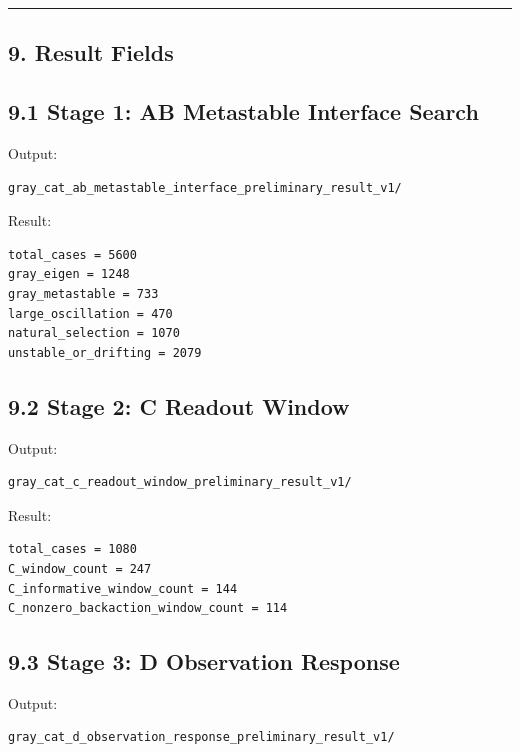 \documentclass{article}
\begin{document}
\begin{center}\rule{0.5\linewidth}{0.5pt}\end{center}

\subsection{9. Result Fields}\label{result-fields}

\subsection{9.1 Stage 1: AB Metastable Interface
Search}\label{stage-1-ab-metastable-interface-search-1}

Output:

\begin{verbatim}
gray_cat_ab_metastable_interface_preliminary_result_v1/
\end{verbatim}

Result:

\begin{verbatim}
total_cases = 5600
gray_eigen = 1248
gray_metastable = 733
large_oscillation = 470
natural_selection = 1070
unstable_or_drifting = 2079
\end{verbatim}

\subsection{9.2 Stage 2: C Readout
Window}\label{stage-2-c-readout-window}

Output:

\begin{verbatim}
gray_cat_c_readout_window_preliminary_result_v1/
\end{verbatim}

Result:

\begin{verbatim}
total_cases = 1080
C_window_count = 247
C_informative_window_count = 144
C_nonzero_backaction_window_count = 114
\end{verbatim}

\subsection{9.3 Stage 3: D Observation
Response}\label{stage-3-d-observation-response}

Output:

\begin{verbatim}
gray_cat_d_observation_response_preliminary_result_v1/
\end{verbatim}
\end{document}
